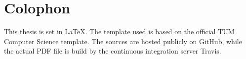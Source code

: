 

\chapter{Colophon}
\label{chapter:Colophon}
This thesis is set in \LaTeX \cite{latex}. The template used is based on the official TUM Computer Science template. The sources are hosted publicly on GitHub, while the actual PDF file is build by the continuous integration server Travis.
